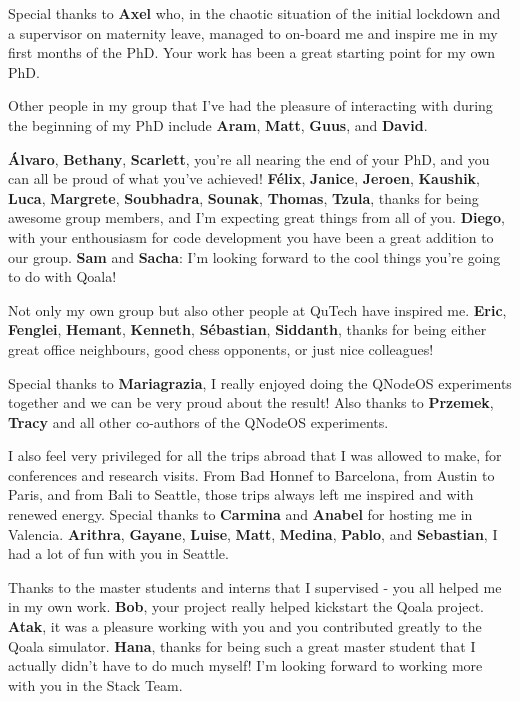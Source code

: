 Special thanks to \textbf{Axel} who, in the chaotic situation of the initial lockdown and a supervisor on maternity leave, managed to on-board me and inspire me in my first months of the PhD.
Your work has been a great starting point for my own PhD.

Other people in my group that I've had the pleasure of interacting with during the beginning of my PhD include
\textbf{Aram}, \textbf{Matt}, \textbf{Guus}, and \textbf{David}.

\textbf{\'Alvaro}, \textbf{Bethany}, \textbf{Scarlett}, you're all nearing the end of your PhD, and you can all be proud of what you've achieved!
\textbf{F\'elix}, \textbf{Janice}, \textbf{Jeroen}, \textbf{Kaushik}, \textbf{Luca}, \textbf{Margrete}, \textbf{Soubhadra}, \textbf{Sounak}, \textbf{Thomas}, \textbf{Tzula}, thanks for being awesome group members, and I'm expecting great things from all of you.
\textbf{Diego}, with your enthousiasm for code development you have been a great addition to our group.
\textbf{Sam} and \textbf{Sacha}: I'm looking forward to the cool things you're going to do with Qoala!

Not only my own group but also other people at QuTech have inspired me.
\textbf{Eric}, \textbf{Fenglei}, \textbf{Hemant}, \textbf{Kenneth}, \textbf{S\'ebastian}, \textbf{Siddanth}, thanks for being either great office neighbours, good chess opponents, or just nice colleagues!

Special thanks to \textbf{Mariagrazia}, I really enjoyed doing the QNodeOS experiments together and we can be very proud about the result!
Also thanks to \textbf{Przemek}, \textbf{Tracy} and all other co-authors of the QNodeOS experiments.

I also feel very privileged for all the trips abroad that I was allowed to make, for conferences and research visits.
From Bad Honnef to Barcelona, from Austin to Paris, and from Bali to Seattle, those trips always left me inspired and with renewed energy.
Special thanks to \textbf{Carmina} and \textbf{Anabel} for hosting me in Valencia.
\textbf{Arithra}, \textbf{Gayane}, \textbf{Luise}, \textbf{Matt}, \textbf{Medina}, \textbf{Pablo}, and \textbf{Sebastian}, I had a lot of fun with you in Seattle.

Thanks to the master students and interns that I supervised - you all helped me in my own work.
\textbf{Bob}, your project really helped kickstart the Qoala project.
\textbf{Atak}, it was a pleasure working with you and you contributed greatly to the Qoala simulator.
\textbf{Hana}, thanks for being such a great master student that I actually didn't have to do much myself!
I'm looking forward to working more with you in the Stack Team.

